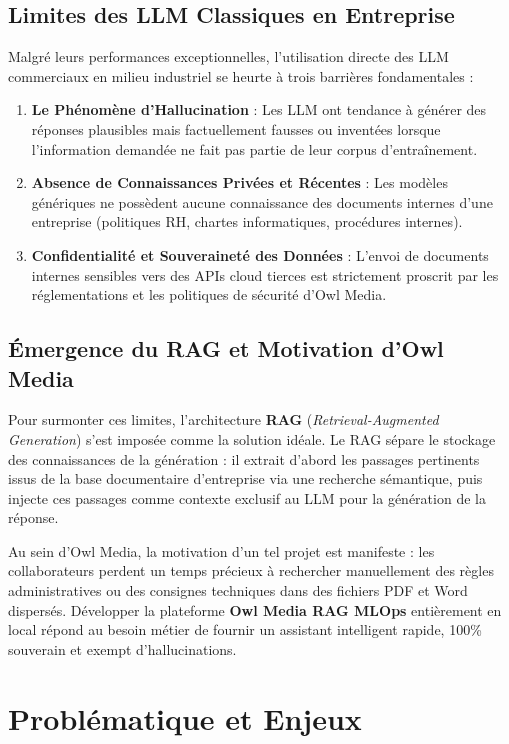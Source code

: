 \subsection{Limites des LLM Classiques en Entreprise}
Malgré leurs performances exceptionnelles, l'utilisation directe des LLM commerciaux en milieu industriel se heurte à trois barrières fondamentales :
\begin{enumerate}
    \item \textbf{Le Phénomène d'Hallucination} : Les LLM ont tendance à générer des réponses plausibles mais factuellement fausses ou inventées lorsque l'information demandée ne fait pas partie de leur corpus d'entraînement.
    \item \textbf{Absence de Connaissances Privées et Récentes} : Les modèles génériques ne possèdent aucune connaissance des documents internes d'une entreprise (politiques RH, chartes informatiques, procédures internes).
    \item \textbf{Confidentialité et Souveraineté des Données} : L'envoi de documents internes sensibles vers des APIs cloud tierces est strictement proscrit par les réglementations et les politiques de sécurité d'Owl Media.
\end{enumerate}

\subsection{Émergence du RAG et Motivation d'Owl Media}
Pour surmonter ces limites, l'architecture \textbf{RAG} (\textit{Retrieval-Augmented Generation}) s'est imposée comme la solution idéale. Le RAG sépare le stockage des connaissances de la génération : il extrait d'abord les passages pertinents issus de la base documentaire d'entreprise via une recherche sémantique, puis injecte ces passages comme contexte exclusif au LLM pour la génération de la réponse.

Au sein d'Owl Media, la motivation d'un tel projet est manifeste : les collaborateurs perdent un temps précieux à rechercher manuellement des règles administratives ou des consignes techniques dans des fichiers PDF et Word dispersés. Développer la plateforme \textbf{Owl Media RAG MLOps} entièrement en local répond au besoin métier de fournir un assistant intelligent rapide, 100\% souverain et exempt d'hallucinations.

\section{Problématique et Enjeux}


